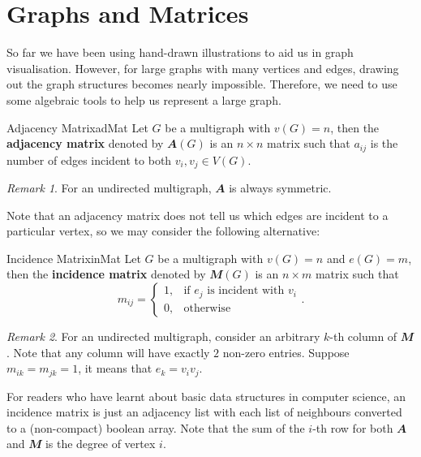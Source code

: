 \documentclass[math]{amznotes}
\theoremstyle{remark}
\newtheorem*{remark}{Remark}
\newcommand{\0}{\mathbf{0}}
\newcommand{\1}{\mathbf{1}}
\begin{document}
\section{Graphs and Matrices}
So far we have been using hand-drawn illustrations to aid us in graph visualisation. However, for large graphs with many vertices and edges, drawing out the graph structures becomes nearly impossible. Therefore, we need to use some algebraic tools to help us represent a large graph.
\begin{dfnbox}{Adjacency Matrix}{adMat}
    Let $G$ be a multigraph with $v(G) = n$, then the {\color{red} \textbf{adjacency matrix}} denoted by $\mathbfit{A}(G)$ is an $n \times n$ matrix such that $a_{ij}$ is the number of edges incident to both $v_i, v_j \in V(G)$.
\end{dfnbox}
\begin{notebox}
    \begin{remark}
        For an undirected multigraph, $\mathbfit{A}$ is always symmetric.
    \end{remark}
\end{notebox}
Note that an adjacency matrix does not tell us which edges are incident to a particular vertex, so we may consider the following alternative:
\begin{dfnbox}{Incidence Matrix}{inMat}
    Let $G$ be a multigraph with $v(G) = n$ and $e(G) = m$, then the {\color{red} \textbf{incidence matrix}} denoted by $\mathbfit{M}(G)$ is an $n \times m$ matrix such that
    \begin{equation*}
        m_{ij} = \begin{cases}
            1, &\textrm{if } e_j \textrm{ is incident with } v_i \\
            0, &\textrm{otherwise}
        \end{cases}.
    \end{equation*}
\end{dfnbox}
\begin{notebox}
    \begin{remark}
        For an undirected multigraph, consider an arbitrary $k$-th column of $\mathbfit{M}$. Note that any column will have exactly $2$ non-zero entries. Suppose $m_{ik} = m_{jk} = 1$, it means that $e_k = v_iv_j$.
    \end{remark}
\end{notebox}
For readers who have learnt about basic data structures in computer science, an incidence matrix is just an adjacency list with each list of neighbours converted to a (non-compact) boolean array. Note that the sum of the $i$-th row for both $\mathbfit{A}$ and $\mathbfit{M}$ is the degree of vertex $i$. 
\end{document}
